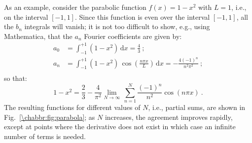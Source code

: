 As an example, consider the parabolic function $f(x)=1-x^2$ with $L=1$, i.e., on the interval $[-1,1]$. Since this function is even over the interval $[-1,1]$, all the $b_n$ integrals will vanish; it is not too difficult to show, e.g., using Mathematica, that the $a_n$ Fourier coefficients are given by:
\begin{equation*}
\begin{split}
	a_0&=\int_{-1}^{+1}(1-x^2)\,\mathrm{d}x = \frac{4}{3}\ ;\\
	a_n&=\int_{-1}^{+1}(1-x^2)\,\cos\left(\frac{n\pi x}{L}\right)\,\mathrm{d}x=-\frac{4(-1)^n}{n^2\pi^2}\ ;\\
\end{split}
\end{equation*}
so that:
\[
	1-x^2 = \frac{2}{3}-\frac{4}{\pi^2}\lim_{N\rightarrow\infty}\,\sum_{n=1}^{N}\frac{(-1)^n}{n^2}\cos\left(n\pi x\right)\ .
\]
The resulting functions for different values of $N$, i.e., partial sums, are shown in Fig.~\ref{\chabbr:fig:parabola}; as $N$ increases, the agreement improves rapidly, except at points where the derivative does not exist in which case an infinite number of terms is needed.

